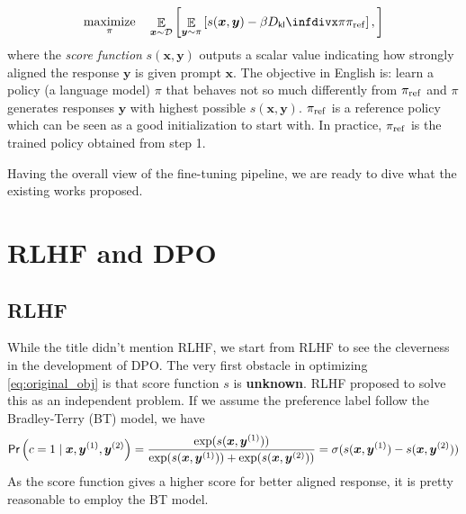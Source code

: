 \documentclass[11pt,a4paper]{article}
\begin{document}
\begin{enumerate}
\begin{equation}
\label{eq:original_obj}
\maximize_{\pi} \quad  \mathop{\mathbb{E}}_{\bm{x} \sim \mathcal{D}} \left[  \mathop{\mathbb{E}}_{\bm{y} \sim \pi} \left[ s(\bm{x}, \bm{y})  - \beta \Dkl{\pi}{\pi_{\rm ref}}\right],
\right] 
\end{equation}
where the \textit{score function} $s(\bm{x}, \bm{y})$ outputs a scalar value indicating how strongly aligned the response $\bm{y}$ is given prompt $\bm{x}$. 
The objective in English is: learn a policy (a language model) $\pi$ that behaves not so much differently from $\pi_{\rm ref}$ and $\pi$ generates responses $\bm{y}$ with highest possible $s(\bm{x}, \bm{y})$.
$\pi_{\rm ref}$ is a reference policy which can be seen as a good initialization to start with. In practice, $\pi_{\rm ref}$ is the trained policy obtained from step 1.
\end{enumerate}

Having the overall view of the fine-tuning pipeline, we are ready to dive what the existing works proposed.

\section{RLHF and DPO}%
\label{sec:rlhf_and_dpo}
\subsection{RLHF}%
\label{sub:rlhf}
While the title didn't mention RLHF, we start from RLHF to see the cleverness in the development of DPO.
The very first obstacle in optimizing \eqref{eq:original_obj} is that score function $s$ is \textbf{unknown}. 
RLHF proposed to solve this as an independent problem. If we assume the preference label follow the Bradley-Terry (BT) model, we have
\begin{equation}
\label{eq:bt_model}
\textsf{Pr}\left(c=1 \mid \bm{x}, \bm{y}^{(1)}, \bm{y}^{(2)}\right) = \dfrac{\exp(s(\bm{x}, \bm{y}^{(1)}))}{\exp(s(\bm{x}, \bm{y}^{(1)})) + \exp(s(\bm{x}, \bm{y}^{(2)}))}
= \sigma(s(\bm{x}, \bm{y}^{(1)}) - s(\bm{x}, \bm{y}^{(2)}))
\end{equation} 
As the score function gives a higher score for better aligned response, it is pretty reasonable to employ the BT model.
\end{document}

